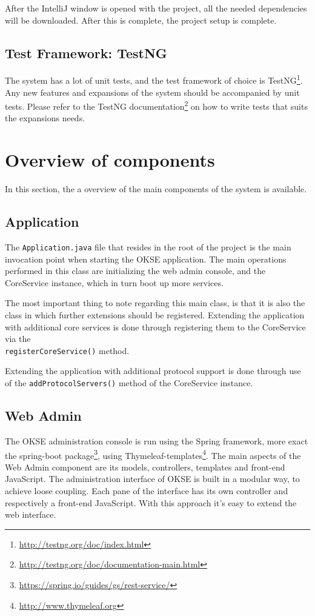 After the IntelliJ window is opened with the project, all the needed dependencies will be downloaded. After this is complete, the project setup is complete.

\subsection{Test Framework: TestNG}
The system has a lot of unit tests, and the test framework of choice is TestNG\footnote{\url{http://testng.org/doc/index.html}}. Any new features and expansions of the system should be accompanied by unit tests. Please refer to the TestNG documentation\footnote{\url{http://testng.org/doc/documentation-main.html}} on how to write tests that suits the expansions needs.

\section{Overview of components}
In this section, the a overview of the main components of the system is available.

\subsection{Application}

The \verb!Application.java! file that resides in the root of the project is the main invocation point when starting the OKSE application. The main operations performed in this class are initializing the web admin console, and the CoreService instance, which in turn boot up more services.

The most important thing to note regarding this main class, is that it is also the class in which further extensions should be registered. Extending the application with additional core services is done through registering them to the CoreService via the \\\verb!registerCoreService()! method.

Extending the application with additional protocol support is done through use of the \verb!addProtocolServers()! method of the CoreService instance.

\subsection{Web Admin}

The OKSE administration console is run using the Spring framework, more exact the spring-boot package\footnote{\url{https://spring.io/guides/gs/rest-service/}}, using Thymeleaf-templates\footnote{\url{http://www.thymeleaf.org}}. The main aspects of the Web Admin component are its models, controllers, templates and front-end JavaScript. The administration interface of OKSE is built in a modular way, to achieve loose coupling. Each pane of the interface has its own controller and respectively a front-end JavaScript.  With this approach it's easy to extend the web interface.

